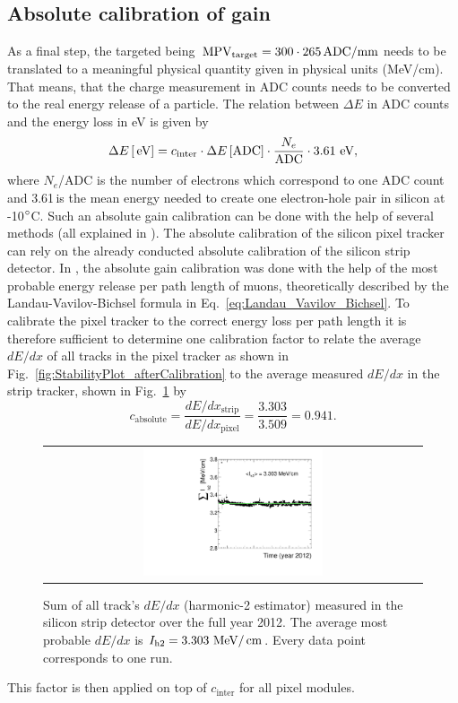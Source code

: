 \subsection*{Absolute calibration of gain}
As a final step, the targeted \mpv being $\,\text{MPV}_{\text{target}}=300 \cdot 265 \,  \text{ADC/mm}$ needs to be translated to a meaningful physical quantity given in physical units (\eg MeV/cm).
That means, that the charge measurement in ADC counts needs to be converted to the real energy release of a particle.
The relation between $\Delta E$ in ADC counts and the energy loss in eV is given by
\begin{equation*}
\Delta E\,[\,\text{e}\kern-0.06667em\text{V}] = c_{\text{inter}} \cdot \Delta E\,[\text{ADC}] \cdot \frac{N_e}{\text{ADC}} \cdot 3.61 \, \,\text{e}\kern-0.06667em\text{V},
\end{equation*}
where $N_e$/ADC is the number of electrons which correspond to one ADC count and 3.61\,\ev is the  mean energy needed to create one electron-hole pair in silicon at -10$\degree$C.
Such an absolute gain calibration can be done with the help of several methods (all explained in \cite{bib:Quertenmont_2010}).
The absolute calibration of the silicon pixel tracker can rely on the already conducted absolute calibration of the silicon strip detector.
In \cite{bib:Quertenmont_2010}, the absolute gain calibration was done with the help of the most probable energy release per path length of muons, 
theoretically described by the Landau-Vavilov-Bichsel formula in Eq.~\ref{eq:Landau_Vavilov_Bichsel}.  
To calibrate the pixel tracker to the correct energy loss per path length it is therefore sufficient to determine one calibration factor to relate the average $dE/dx$ of all tracks in the pixel tracker as shown in 
Fig.~\ref{fig:StabilityPlot_afterCalibration} to the average measured $dE/dx$ in the strip tracker, shown in Fig.~\ref{fig:StabilityPlot_Strip} by
\begin{equation*}
c_{\text{absolute}} = \frac{dE/dx_{\text{strip}}}{dE/dx_{\text{pixel}}} = \frac{3.303}{3.509} = 0.941.
\end{equation*}
\begin{figure}[!bt]
  \centering 
  \begin{tabular}{c}
  \includegraphics[width=0.49\textwidth]{figures/analysis/PixelCalibration/StabilityPlot_Strip_afterCalibration_withoutStepFits_NEW.pdf}
  \end{tabular}
  \caption{Sum of all track's $dE/dx$ (harmonic-2 estimator) measured in the silicon strip detector over the full year 2012. The average most probable $dE/dx$ is $I_{\text{h2}}=3.303\,\,\text{Me}\kern-0.06667em\text{V}/\,\text{cm}$. Every data point corresponds to one run.} 
  \label{fig:StabilityPlot_Strip}
\end{figure}
This factor is then applied on top of $c_{\text{inter}}$ for all pixel modules.

